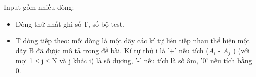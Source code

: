Input gồm nhiều dòng:  
\begin{itemize}
	\item     Dòng thứ nhất ghi số T, số bộ test.   
	\item     T dòng tiếp theo: mỗi dòng là một dãy các kí tự liên tiếp nhau thể hiện một dãy B đã được mô tả trong đề bài. Kí tự thứ i là '+' nếu tích ($A_{i}$    - $A_{j}$    ) (với mọi 1 ≤ j ≤ N và j khác i) là số dương, '-' nếu tích là số âm, '0' nếu tích bằng 0.   
\end{itemize}